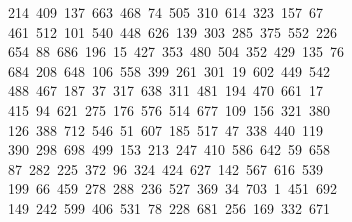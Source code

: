 \begin{tabbing}
\ 214\ 409\ 137\ 663\ 468\ 74\ 505\ 310\ 614\ 323\ 157\ 67\\[0pt]
\>\ 461\ 512\ 101\ 540\ 448\ 626\ 139\ 303\ 285\ 375\ 552\ 226\\[0pt]
\>\ 654\ 88\ 686\ 196\ 15\ 427\ 353\ 480\ 504\ 352\ 429\ 135\ 76\\[0pt]
\>\ 684\ 208\ 648\ 106\ 558\ 399\ 261\ 301\ 19\ 602\ 449\ 542\ \\[0pt]
\ 488\ 467\ 187\ 37\ 317\ 638\ 311\ 481\ 194\ 470\ 661\ 17\\[0pt]
\>\ 415\ 94\ 621\ 275\ 176\ 576\ 514\ 677\ 109\ 156\ 321\ 380\ \\[0pt]
\ 126\ 388\ 712\ 546\ 51\ 607\ 185\ 517\ 47\ 338\ 440\ 119\\[0pt]
\>\ 390\ 298\ 698\ 499\ 153\ 213\ 247\ 410\ 586\ 642\ 59\ 658\ \\[0pt]
\ 87\ 282\ 225\ 372\ 96\ 324\ 424\ 627\ 142\ 567\ 616\ 539\\[0pt]
\>\ 199\ 66\ 459\ 278\ 288\ 236\ 527\ 369\ 34\ 703\ 1\ 451\ 692\\[0pt]
\>\ 149\ 242\ 599\ 406\ 531\ 78\ 228\ 681\ 256\ 169\ 332\ 671\ \\[0pt]

\end{tabbing}
